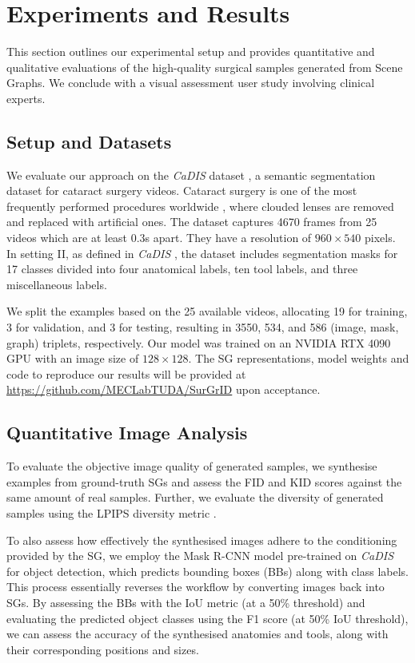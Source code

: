 \section{Experiments and Results}
\label{sec:exp}
This section outlines our experimental setup and provides quantitative and qualitative evaluations of the high-quality surgical samples generated from Scene Graphs. We conclude with a visual assessment user study involving clinical experts.

\subsection{Setup and Datasets}
We evaluate our approach on the \emph{CaDIS} dataset \cite{grammatikopoulou2021cadis}, a semantic segmentation dataset for cataract surgery videos. Cataract surgery is one of the most frequently performed procedures worldwide \cite{allen2006cataract}, where clouded lenses are removed and replaced with artificial ones. The dataset captures 4670 frames from 25 videos which are at least 0.3s apart. They have a resolution of $960\times540$ pixels. In setting II, as defined in \emph{CaDIS} \cite{grammatikopoulou2021cadis}, the dataset includes segmentation masks for 17 classes divided into four anatomical labels, ten tool labels, and three miscellaneous labels. 

We split the examples based on the 25 available videos, allocating 19 for training, 3 for validation, and 3 for testing, resulting in 3550, 534, and 586 (image, mask, graph) triplets, respectively. Our model was trained on an NVIDIA RTX 4090 GPU with an image size of $128\times128$. The SG representations, model weights and code to reproduce our results will be provided at \href{https://github.com/MECLabTUDA/SurGrID}{https://github.com/MECLabTUDA/SurGrID} upon acceptance.

\subsection{Quantitative Image Analysis}
To evaluate the objective image quality of generated samples, we synthesise examples from ground-truth SGs and assess the FID and KID scores \cite{binkowski2018demystifying} against the same amount of real samples. Further, we evaluate the diversity of generated samples using the LPIPS diversity metric \cite{zhang2018unreasonable}.

To also assess how effectively the synthesised images adhere to the conditioning provided by the SG, we employ the Mask R-CNN model \cite{he2017mask} pre-trained on \emph{CaDIS} \cite{grammatikopoulou2021cadis} for object detection, which predicts bounding boxes (BBs) along with class labels. This process essentially reverses the workflow by converting images back into SGs. By assessing the BBs with the IoU metric (at a 50\% threshold) and evaluating the predicted object classes using the F1 score (at 50\% IoU threshold), we can assess the accuracy of the synthesised anatomies and tools, along with their corresponding positions and sizes. 

